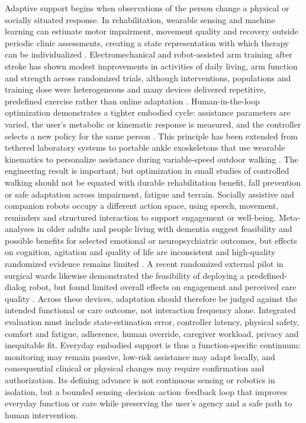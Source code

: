 Adaptive support begins when observations of the person change a physical or socially situated response. In rehabilitation, wearable sensing and machine learning can estimate motor impairment, movement quality and recovery outside periodic clinic assessments, creating a state representation with which therapy can be individualized \cite{AdansDester2020PrecisionRehabilitation}. Electromechanical and robot-assisted arm training after stroke has shown modest improvements in activities of daily living, arm function and strength across randomized trials, although interventions, populations and training dose were heterogeneous and many devices delivered repetitive, predefined exercise rather than online adaptation \cite{Mehrholz2018RobotArmTraining}. Human-in-the-loop optimization demonstrates a tighter embodied cycle: assistance parameters are varied, the user's metabolic or kinematic response is measured, and the controller selects a new policy for the same person \cite{Zhang2017ExoskeletonOptimization,Ding2018SoftExosuit}. This principle has been extended from tethered laboratory systems to portable ankle exoskeletons that use wearable kinematics to personalize assistance during variable-speed outdoor walking \cite{Slade2022RealWorldExoskeleton}. The engineering result is important, but optimization in small studies of controlled walking should not be equated with durable rehabilitation benefit, fall prevention or safe adaptation across impairment, fatigue and terrain. Socially assistive and companion robots occupy a different action space, using speech, movement, reminders and structured interaction to support engagement or well-being. Meta-analyses in older adults and people living with dementia suggest feasibility and possible benefits for selected emotional or neuropsychiatric outcomes, but effects on cognition, agitation and quality of life are inconsistent and high-quality randomized evidence remains limited \cite{Pu2019SocialRobots,Yu2022DementiaSocialRobots,Hsieh2023DementiaSocialRobots}. A recent randomized external pilot in surgical wards likewise demonstrated the feasibility of deploying a predefined-dialog robot, but found limited overall effects on engagement and perceived care quality \cite{Mlakar2025SocialRobotPilot}. Across these devices, adaptation should therefore be judged against the intended functional or care outcome, not interaction frequency alone. Integrated evaluation must include state-estimation error, controller latency, physical safety, comfort and fatigue, adherence, human override, caregiver workload, privacy and inequitable fit. Everyday embodied support is thus a function-specific continuum: monitoring may remain passive, low-risk assistance may adapt locally, and consequential clinical or physical changes may require confirmation and authorization. Its defining advance is not continuous sensing or robotics in isolation, but a bounded sensing--decision--action--feedback loop that improves everyday function or care while preserving the user's agency and a safe path to human intervention.
